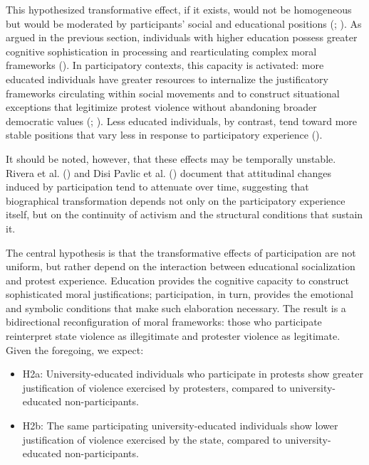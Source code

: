 \documentclass[
  13pt,
]{article}
\begin{document}
This hypothesized transformative effect, if it exists, would not be
homogeneous but would be moderated by participants' social and
educational positions (;
). As argued
in the previous section, individuals with higher education possess
greater cognitive sophistication in processing and rearticulating
complex moral frameworks (). In participatory contexts, this capacity is activated: more
educated individuals have greater resources to internalize the
justificatory frameworks circulating within social movements and to
construct situational exceptions that legitimize protest violence
without abandoning broader democratic values
(;
). Less
educated individuals, by contrast, tend toward more stable positions
that vary less in response to participatory experience
().

It should be noted, however, that these effects may be temporally
unstable. Rivera et al. () and Disi Pavlic et al.
() document that attitudinal changes induced by participation tend
to attenuate over time, suggesting that biographical transformation
depends not only on the participatory experience itself, but on the
continuity of activism and the structural conditions that sustain it.

The central hypothesis is that the transformative effects of
participation are not uniform, but rather depend on the interaction
between educational socialization and protest experience. Education
provides the cognitive capacity to construct sophisticated moral
justifications; participation, in turn, provides the emotional and
symbolic conditions that make such elaboration necessary. The result is
a bidirectional reconfiguration of moral frameworks: those who
participate reinterpret state violence as illegitimate and protester
violence as legitimate. Given the foregoing, we expect:

\begin{itemize}
\item
  H2a: University-educated individuals who participate in protests show
  greater justification of violence exercised by protesters, compared to
  university-educated non-participants.
\item
  H2b: The same participating university-educated individuals show lower
  justification of violence exercised by the state, compared to
  university-educated non-participants.
\end{itemize}
\end{document}
